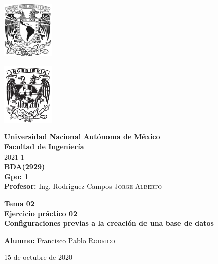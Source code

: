 \documentclass{article}
\newcommand{\materia}{BDA}
\newcommand{\clave}{2929}
\newcommand{\profesor}{Ing. Rodriguez Campos \textsc{Jorge Alberto}}
\newcommand{\semestre}{2021-1}
\newcommand{\alumno}{Francisco Pablo \textsc{Rodrigo}}
\newcommand{\actividad}{Tema 02 \\ Ejercicio práctico 02}
\newcommand{\titulo}{Configuraciones previas a la creación de una base de datos}
\newcommand{\fechaEntrega}{15 de octubre de 2020}
\begin{document}
\thispagestyle{empty}
\begin{minipage}[t][5cm][t]{0.2\linewidth}
    \includegraphics[width=2.5cm]{unam.jpg}
    \vspace{10cm}

    \includegraphics[width=2.5cm]{fiblack}
\end{minipage}
\begin{minipage}[t]{0.7\linewidth}
    \vspace{-2.5cm}
    \LARGE{\textbf{Universidad Nacional Autónoma de México}}\\
    \Large{\textbf{Facultad de Ingeniería}} \\

    \large{\semestre}\\[2cm]

    \large{\textbf{\materia (\clave)}}\\
    \large{\textbf{Gpo: 1}}\\[5mm]
    \large{\textbf{Profesor:} \profesor}\\ [1.5cm]
    \begin{center}
        \LARGE{\textbf{\actividad}}\\
        \LARGE{\textbf{\titulo}}\\
    \end{center}

    \vspace{3.3cm}

    \large{\textbf{Alumno:} \alumno} \\[1.5cm]

    \begin{flushright}
        \fechaEntrega%
    \end{flushright}
\end{minipage}

\newpage
\end{document}
